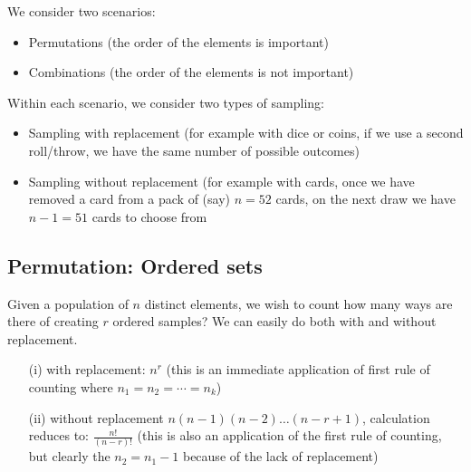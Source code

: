 \documentclass[12pt]{extbook}
\begin{document}
We consider two scenarios:
\begin{itemize}
\item Permutations (the order of the elements is important)
\item Combinations (the order of the elements is not important)
\end{itemize}

Within each scenario, we consider two types of sampling:
\begin{itemize}
\item Sampling with replacement (for example with dice or coins, if we use a second roll/throw, we have the same number of possible outcomes)
\item Sampling without replacement (for example with cards, once we have removed a card from a pack of (say) $n=52$ cards, on the next draw we have $n-1=51$ cards to choose from
\end{itemize}



 





 


\subsection{Permutation: Ordered sets}



Given a population of $n$ distinct elements, we wish to count how many ways are there of creating $r$ ordered samples?   We can easily do both with and without replacement.

\begin{itemize}
\item[(i)] with replacement: $n^r$ (this is an immediate application of first rule of counting where $n_1=n_2=\cdots=n_k$)
\item[(ii)] without replacement $n(n-1)(n-2)\ldots(n-r+1)$,  calculation reduces to: $\frac{n!}{(n-r)!}$ (this is also an application of the first rule of counting, but clearly the $n_2=n_1-1$ because of the lack of replacement)
\end{itemize}
\end{document}
